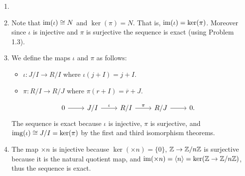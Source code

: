\documentclass[Notebook.tex]{subfiles}
\begin{document}
\begin{solution}
    \bbni 
    \begin{enumerate}
        \item 

        \item Note that $\operatorname{im}(\iota) \cong N$ and $\ker(\pi) =N$. That is, $\operatorname{im}(\iota) = \ker(\pi)$. Moreover since $\iota$ is injective and $\pi$ is surjective the sequence is exact (using Problem 1.3). 

        \item We define the maps $\iota$ and $\pi$ as follows: 
        \begin{itemize}
            \item $\iota: J/I \to R/I$ where $\iota(j+I) = j+I$.
            \item $\pi: R/I \to R/J$ where $\pi(r + I) = \overline{r} + J$. 
        \end{itemize}
        \[
        \begin{tikzcd}
        0 \arrow[r] & J/I \arrow[r, "\iota"] & R/I \arrow[r,"\pi" ] & R/J \arrow[r] & 0.
        \end{tikzcd}
        \]
        The sequence is exact because $\iota$ is injective, $\pi$ is surjective, and $\operatorname{img}(\iota) \cong J/I = \ker(\pi)$ by the first and third isomorphism theorems.  

        \item The map $\times n$ is injective because $\ker(\times n) = \{0\}$, $\mathbb Z \to \mathbb Z/n\mathbb Z$ is surjective because it is the natural quotient map, and $\operatorname{im}(\times n) = \langle n \rangle = \ker(\mathbb Z \to \mathbb Z/n\mathbb Z)$, thus the sequence is exact. 
         
    \end{enumerate}
\end{solution}

\newpage 
\end{document}
